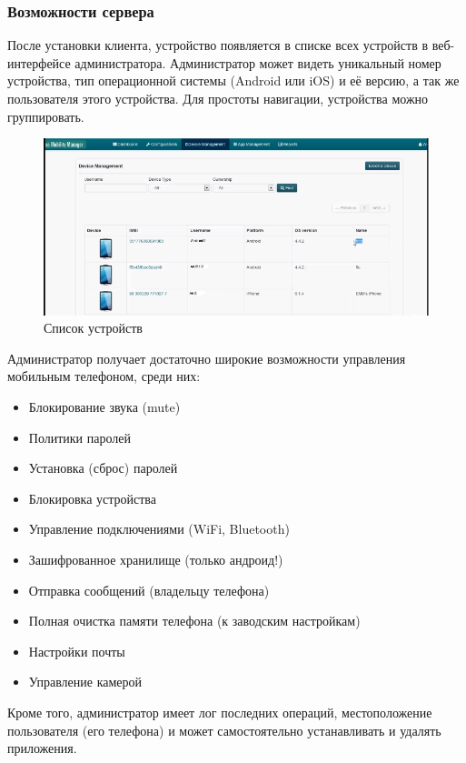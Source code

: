 \documentclass[a4paper, 12pt]{article}		%
\begin{document}
\subsubsection{Возможности сервера}

После установки клиента, устройство появляется в списке всех устройств в веб-интерфейсе администратора. Администратор может видеть уникальный номер устройства, тип операционной системы (Android или iOS) и её версию, а так же пользователя этого устройства. Для простоты навигации, устройства можно группировать.

\begin{figure}[h!]
\centering
\includegraphics[scale=0.6]{res/EMM006}
\caption{Список устройств}
\end{figure}

Администратор получает достаточно широкие возможности управления мобильным телефоном, среди них:
\begin{itemize}
\item Блокирование звука (mute)
\item Политики паролей
\item Установка (сброс) паролей
\item Блокировка устройства
\item Управление подключениями (WiFi, Bluetooth)
\item Зашифрованное хранилище (только андроид!)
\item Отправка сообщений (владельцу телефона)
\item Полная очистка памяти телефона (к заводским настройкам)
\item Настройки почты
\item Управление камерой
\end{itemize}

Кроме того, администратор имеет лог последних операций, местоположение пользователя (его телефона) и может самостоятельно устанавливать и удалять приложения.
\end{document}
